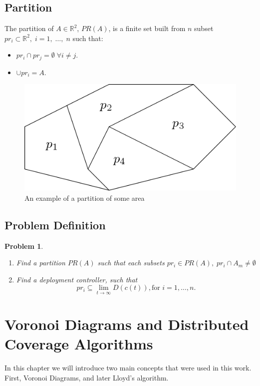 \documentclass{iacas}
\newcommand{\rsqr}{\mathbb{R}^2}
\newtheorem{problem}{Problem}
\begin{document}
\subsection{Partition}
The partition of $A \in \rsqr$, $PR(A)$, is a finite set built from $n$ subset $pr_i \subset \rsqr,\; i=1,\; \ldots,\; n$ such that:
\begin{itemize}
\item $pr_i \cap pr_j = \emptyset \; \forall i \neq j$.
\item $\cup pr_i = A$.
\end{itemize}

\begin{figure}[!ht]
\centering
\includegraphics[scale=0.4]{figures/problem-def/partitioning.png}
\caption{An example of a partition of some area}
\end{figure}

\subsection{Problem Definition}
\begin{problem} \label{GeneralProblem}
\begin{enumerate}
\item Find a partition $PR(A)$ such that each subsets $pr_i \in PR(A), \; pr_i \cap A_m \neq \emptyset$
\item Find a deployment controller, such that $$ pr_i \subseteq \lim_{t\rightarrow \infty}D(c(t)),\text{for }i=1,\ldots,n.$$
\end{enumerate}
\end{problem}


\section{Voronoi Diagrams and Distributed Coverage Algorithms}
In this chapter we will introduce two main concepts that were used in this work. First, Voronoi Diagrams, and later Lloyd's algorithm.
\end{document}
